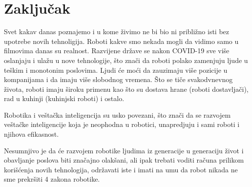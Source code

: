 \documentclass{article}
\begin{document}
	\section{Zaključak}
 Svet kakav danas poznajemo i u kome živimo ne bi bio ni približno isti bez upotrebe novih tehnoligija. Roboti kakve smo nekada mogli da vidimo samo u filmovima danas su realnost. Razvijene države se nakon COVID-19 sve više oslanjaju i ulažu u nove tehnologije, što znači da roboti polako zamenjuju ljude u teškim i monotonim poslovima. Ljudi će moći da zauzimaju više pozicije u kompanijama i da imaju više slobodnog vremena. Što se tiče svakodvnevnog života, roboti imaju široku primenu kao što su dostava hrane (roboti dostavljači), rad u kuhinji (kuhinjski roboti) i ostalo.

 Robotika i veštačka inteligencija su usko povezani, što znači da se razvojem veštačke inteligencije koja je neophodna u robotici, unapredjuju i sami roboti i njihova efikasnost. 

 Nesumnjivo je da će razvojem robotike ljudima iz generacije u generaciju život i obavljanje poslova biti značajno olakšani, ali ipak trebati voditi računa prilikom korišćenja novih tehnologija, održavati iste i imati na umu da robot nikada ne sme prekršiti 4 zakona robotike.
	
\pagebreak
\end{document}
